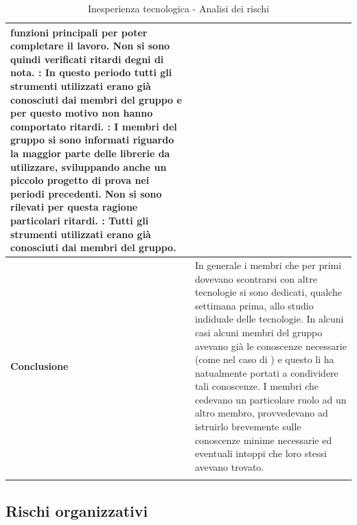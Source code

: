 \documentclass[12pt,a4paper]{article}
\begin{document}
\begin{center}
\begin{longtable}[H]{p{} p{}}
            funzioni principali per poter completare il lavoro. Non si sono quindi verificati ritardi
            degni di nota. \newline
        \textbf{\FPD{}}: In questo periodo tutti gli strumenti utilizzati erano già conosciuti dai membri
              	del gruppo e per questo motivo non hanno comportato ritardi. \newline
             	\textbf{\FC{}}: I membri del gruppo si sono informati riguardo la maggior parte delle librerie da utilizzare, sviluppando anche un piccolo progetto di prova nei periodi precedenti. Non si sono rilevati per questa ragione particolari ritardi. \newline
        \textbf{\FVV{}}: Tutti gli strumenti utilizzati erano già conosciuti dai membri del gruppo. \\*
	  	\midrule
	    \textbf{Conclusione} & In generale i membri che per primi dovevano scontrarsi con altre tecnologie si sono dedicati, qualche settimana prima, allo studio indiduale delle tecnologie. In alcuni casi alcuni membri del gruppo avevano già le conoscenze necessarie (come nel caso di \mgls{git}) e questo li ha natualmente portati a condividere tali conoscenze. I membri che cedevano un particolare ruolo ad un altro membro, provvedevano ad istruirlo brevemente sulle conoscenze minime necessarie ed eventuali intoppi che loro stessi avevano trovato. \\*
		\bottomrule
		\caption{Inesperienza tecnologica - Analisi dei rischi}
	\end{longtable}
\end{center}


\subsection{Rischi organizzativi}
\end{document}
